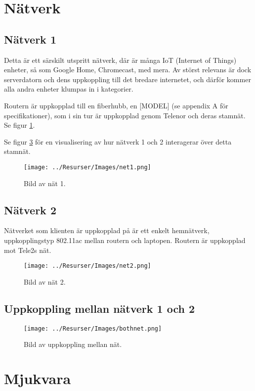 \documentclass[journal,comsoc]{IEEEtran}
\begin{document}
\section{Nätverk}
\subsection{Nätverk 1}
Detta är ett särskilt utspritt nätverk, där är många IoT (Internet of Things) enheter, så som Google Home, Chromecast, med mera. Av störst relevans är dock serverdatorn och dens uppkoppling till det bredare internetet, och därför kommer alla andra enheter klumpas in i kategorier.

Routern är uppkopplad till en fiberhubb, en [MODEL] (se appendix A för specifikationer), som i sin tur är uppkopplad genom Telenor och deras stamnät. Se figur \ref{fig:net1}.

Se figur \ref{fig:nettonet} för en visualisering av hur nätverk 1 och 2 interagerar över detta stamnät.
\begin{figure} [H]
  \centering
  \texttt{[image: ../Resurser/Images/net1.png]}
  \caption{Bild av nät 1.}
  \label{fig:net1}
\end{figure}


\subsection{Nätverk 2}
Nätverket som klienten är uppkopplad på är ett enkelt hemnätverk, uppkopplingstyp 802.11ac mellan routern och laptopen. Routern är uppkopplad mot Tele2s nät.
\begin{figure} [H]
  \centering
  \texttt{[image: ../Resurser/Images/net2.png]}
  \caption{Bild av nät 2.}
  \label{fig:net2}
\end{figure}
\subsection{Uppkoppling mellan nätverk 1 och 2}
\begin{figure} [H]
  \centering
  \texttt{[image: ../Resurser/Images/bothnet.png]}
  \caption{Bild av uppkoppling mellan nät.}
  \label{fig:nettonet}
\end{figure}

\label{appendix:software}
\section{Mjukvara}
\end{document}
